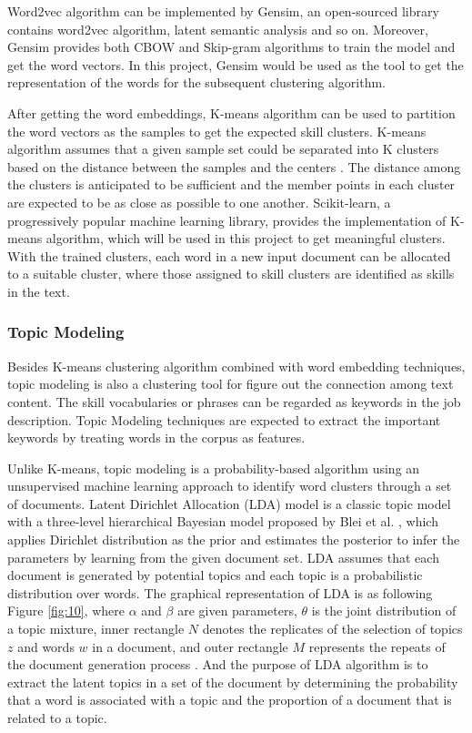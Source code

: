 Word2vec algorithm can be implemented by Gensim, an open-sourced library contains word2vec algorithm, latent semantic analysis and so on. Moreover, Gensim provides both CBOW and Skip-gram algorithms to train the model and get the word vectors. In this project, Gensim would be used as the tool to get the representation of the words for the subsequent clustering algorithm.

After getting the word embeddings, K-means algorithm can be used to partition the word vectors as the samples to get the expected skill clusters. K-means algorithm assumes that a given sample set could be separated into K clusters based on the distance between the samples and the centers \cite{macqueen1967classification}. The distance among the clusters is anticipated to be sufficient and the member points in each cluster are expected to be as close as possible to one another. Scikit-learn, a progressively popular machine learning library, provides the implementation of K-means algorithm, which will be used in this project to get meaningful clusters. With the trained clusters, each word in a new input document can be allocated to a suitable cluster, where those assigned to skill clusters are identified as skills in the text.


\subsubsection{Topic Modeling}
Besides K-means clustering algorithm combined with word embedding techniques, topic modeling is also a clustering tool for figure out the connection among text content. The skill vocabularies or phrases can be regarded as keywords in the job description. Topic Modeling techniques are expected to extract the important keywords by treating words in the corpus as features.


Unlike K-means, topic modeling is a probability-based algorithm using an unsupervised machine learning approach to identify word clusters through a set of documents. Latent Dirichlet Allocation (LDA) model is a classic topic model with a three-level hierarchical Bayesian model proposed by Blei et al. \cite{blei2003latent}, which applies Dirichlet distribution as the prior and estimates the posterior to infer the parameters by learning from the given document set. LDA assumes that each document is generated by potential topics and each topic is a probabilistic distribution over words. The graphical representation of LDA is as following Figure \ref{fig:10}, where $\alpha$ and $\beta$ are given parameters, $\theta$ is the joint distribution of a topic mixture, inner rectangle $N$ denotes the replicates of the selection of topics $z$ and words $w$ in a document, and outer rectangle $M$ represents the repeats of the document generation process \cite{blei2003latent}. And the purpose of LDA algorithm is to extract the latent topics in a set of the document by determining the probability that a word is associated with a topic and the proportion of a document that is related to a topic.

